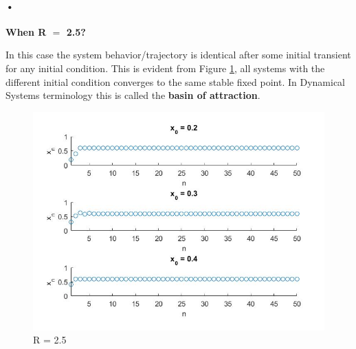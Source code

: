 \documentclass[11pt,a4paper]{article}
\begin{document}
\paragraph{•}
\textbf{When R $=$ 2.5?}\\ 
\par\medskip
In this case the system behavior/trajectory is identical after some initial transient for any initial condition. This is evident from Figure \ref{fig:boa}, all systems with the different initial condition converges to the same stable fixed point. In Dynamical Systems terminology this is called the \textbf{basin of attraction}. 
\begin{figure}[H]
{
\centering
\includegraphics[scale=0.70]{images/boa.jpg}
\caption{R = 2.5}
\label{fig:boa}
}
\end{figure}
\end{document}
